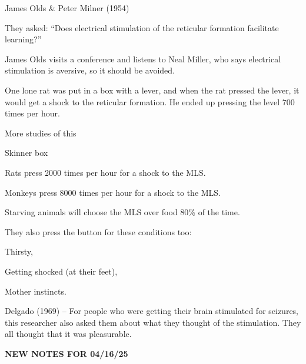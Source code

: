 \begin{coloredlist}
\begin{coloredlist}
\begin{coloredlist}
        \end{coloredlist}
        \item James Olds \& Peter Milner (1954)
        \begin{coloredlist}
            \item They asked: ``Does electrical stimulation of the reticular formation facilitate learning?''
            \item James Olds visits a conference and listens to Neal Miller, who says electrical stimulation is aversive, so it should be avoided.
            \item One lone rat was put in a box with a lever, and when the rat pressed the lever, it would get a shock to the reticular formation. He ended up pressing the level 700 times per hour.
        \end{coloredlist}
        \item More studies of this
        \begin{coloredlist}
            \item Skinner box
            \begin{coloredlist}
                \item Rats press 2000 times per hour for a shock to the MLS.
                \item Monkeys press 8000 times per hour for a shock to the MLS.
                \item Starving animals will choose the MLS over food 80\% of the time. 
                \item They also press the button for these conditions too:
                \begin{coloredlist}
                    \item Thirsty,
                    \item Getting shocked (at their feet),
                    \item Mother instincts.
                \end{coloredlist}
            \end{coloredlist}
        \end{coloredlist}
        \item Delgado (1969) -- For people who were getting their brain stimulated for seizures, this researcher also asked them about what they thought of the stimulation. They all thought that it was pleasurable.   
    \end{coloredlist}
\end{coloredlist}

\begin{center}
    \textbf{NEW NOTES FOR 04/16/25} \\
    \hrulefill
\end{center}


